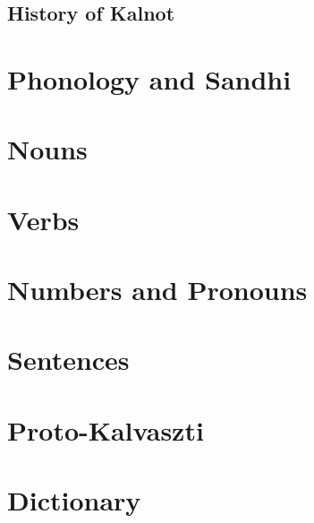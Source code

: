 \documentclass{report}
\begin{document}
\section{History of Kalnot}

\chapter{Phonology and Sandhi}

\chapter{Nouns}

\chapter{Verbs}

\chapter{Numbers and Pronouns}

\chapter{Sentences}


\appendix
\chapter{Proto-Kalvaszti}

\chapter{Dictionary}
\end{document}
